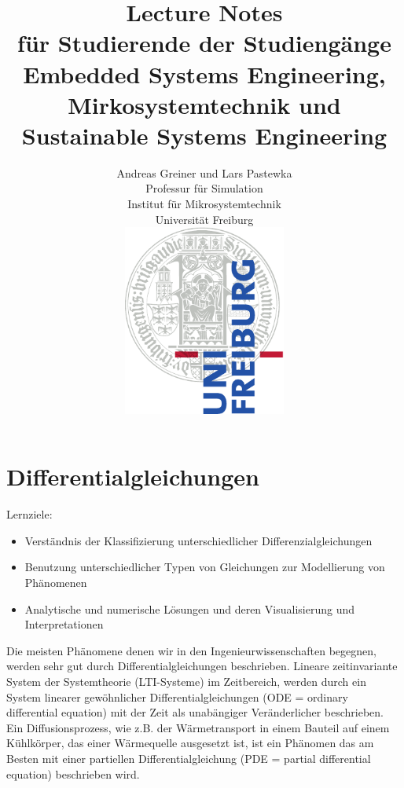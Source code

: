\documentclass[a4paper,12pt]{book}%
\title{\huge Lecture Notes\\
\large für Studierende der Studiengänge Embedded Systems Engineering, Mirkosystemtechnik und Sustainable Systems Engineering}
\author{Andreas Greiner und Lars Pastewka \\Professur für Simulation\\Institut für Mikrosystemtechnik\\Universität Freiburg\\[1cm]
  \includegraphics[width=0.4\textwidth]{fig/Uni_Logo-Grundversion_E1_A4_RGB}
}
\begin{document}
\frontmatter
\maketitle
\part{Differentialgleichungen}
Lernziele:
\begin{itemize}
\item Verständnis der Klassifizierung unterschiedlicher Differenzialgleichungen
\item Benutzung unterschiedlicher Typen von Gleichungen zur Modellierung von Phä\-nomenen
\item Analytische und numerische Lösungen und deren Visualisierung und Interpretationen
\end{itemize}
Die meisten Phänomene denen wir in den Ingenieurwissenschaften begegnen, werden
sehr gut durch Differentialgleichungen beschrieben. Lineare zeitinvariante
System der Systemtheorie {(LTI-Systeme)} im Zeitbereich, 
werden durch ein System linearer gewöhnlicher
Differentialgleichungen (ODE = ordinary differential equation) mit der Zeit als
unabängiger Veränderlicher beschrieben. Ein Diffusionsprozess, wie z.B. der
Wärmetransport in einem Bauteil auf einem Kühlkörper, das einer Wärmequelle
ausgesetzt ist, ist ein Phänomen das am Besten mit einer partiellen
Differentialgleichung (PDE = partial differential equation) beschrieben wird.
\end{document}
